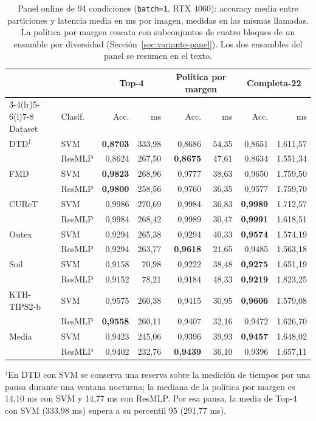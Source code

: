\documentclass[a4paper,fleqn]{cas-sc}
\begin{document}
\begin{table}[pos=htbp]
\centering
\caption{Panel online de 94 condiciones (\texttt{batch=1}, RTX 4060): accuracy media entre particiones y latencia media en ms por imagen, medidas en las mismas llamadas. La política por margen rescata con subconjuntos de cuatro bloques de un ensamble por diversidad (Sección~\ref{sec:variante-panel}). Los dos ensambles del panel se resumen en el texto.}
\label{tab:panel}
\small
\setlength{\tabcolsep}{4.5pt}
\begin{tabular}{@{}llrrrrrr@{}}
\toprule
 & & \multicolumn{2}{c}{Top-4} & \multicolumn{2}{c}{Política por margen} & \multicolumn{2}{c}{Completa-22} \\
\cmidrule(lr){3-4}\cmidrule(lr){5-6}\cmidrule(l){7-8}
Dataset & Clasif. & Acc. & ms & Acc. & ms & Acc. & ms \\
\midrule
DTD$^{\dagger}$ & SVM & \textbf{0,8703} & 333,98 & 0,8686 & 54,35 & 0,8651 & 1.611,57 \\
 & ResMLP & 0,8624 & 267,50 & \textbf{0,8675} & 47,61 & 0,8634 & 1.551,34 \\
FMD & SVM & \textbf{0,9823} & 268,96 & 0,9777 & 38,63 & 0,9650 & 1.759,50 \\
 & ResMLP & \textbf{0,9800} & 258,56 & 0,9760 & 36,35 & 0,9577 & 1.759,70 \\
CUReT & SVM & 0,9986 & 270,69 & 0,9984 & 36,83 & \textbf{0,9989} & 1.712,57 \\
 & ResMLP & 0,9984 & 268,42 & 0,9989 & 30,47 & \textbf{0,9991} & 1.618,51 \\
Outex & SVM & 0,9294 & 265,38 & 0,9294 & 40,33 & \textbf{0,9574} & 1.574,19 \\
 & ResMLP & 0,9294 & 263,77 & \textbf{0,9618} & 21,65 & 0,9485 & 1.563,18 \\
Soil & SVM & 0,9158 & 70,98 & 0,9222 & 38,48 & \textbf{0,9275} & 1.651,19 \\
 & ResMLP & 0,9152 & 78,21 & 0,9184 & 48,33 & \textbf{0,9219} & 1.823,25 \\
KTH-TIPS2-b & SVM & 0,9575 & 260,38 & 0,9415 & 30,95 & \textbf{0,9606} & 1.579,08 \\
 & ResMLP & \textbf{0,9558} & 260,11 & 0,9407 & 32,16 & 0,9472 & 1.626,70 \\
\midrule
Media & SVM & 0,9423 & 245,06 & 0,9396 & 39,93 & \textbf{0,9457} & 1.648,02 \\
 & ResMLP & 0,9402 & 232,76 & \textbf{0,9439} & 36,10 & 0,9396 & 1.657,11 \\
\bottomrule
\end{tabular}

\vspace{0.35em}
\begin{minipage}{0.98\textwidth}\footnotesize
$^{\dagger}$En DTD con SVM se conserva una reserva sobre la medición de tiempos por una pausa durante una ventana nocturna; la mediana de la política por margen es 14,10 ms con SVM y 14,77 ms con ResMLP. Por esa pausa, la media de Top-4 con SVM (333,98 ms) supera a su percentil 95 (291,77 ms).
\end{minipage}
\end{table}
\end{document}
